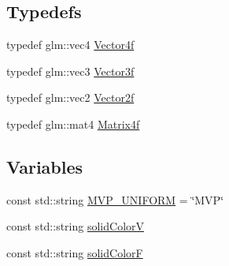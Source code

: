 \subsection*{Typedefs}
\begin{DoxyCompactItemize}
\item 
typedef glm\-::vec4 \hyperlink{namespaceburn_a2907b7b4adbde67cc68c401d9a30bdfe}{Vector4f}
\item 
typedef glm\-::vec3 \hyperlink{namespaceburn_a9d6d349c94bc4dc9699427216128a0ef}{Vector3f}
\item 
typedef glm\-::vec2 \hyperlink{namespaceburn_a2af71ec5609a2f2d501827804e86a9b8}{Vector2f}
\item 
typedef glm\-::mat4 \hyperlink{namespaceburn_a643e9d2ffceb4304e3755a100268a7a3}{Matrix4f}
\end{DoxyCompactItemize}
\subsection*{Variables}
\begin{DoxyCompactItemize}
\item 
const std\-::string \hyperlink{namespaceburn_a6e76b4eddd0b0e54b5969cde910d0bc0}{M\-V\-P\-\_\-\-U\-N\-I\-F\-O\-R\-M} = \char`\"{}M\-V\-P\char`\"{}
\item 
const std\-::string \hyperlink{namespaceburn_a6eafdfe4d85acab9368409999e505dd3}{solid\-Color\-V}
\item 
const std\-::string \hyperlink{namespaceburn_ab930855fc914e51fe8d7f734a5534c6d}{solid\-Color\-F}
\end{DoxyCompactItemize}


